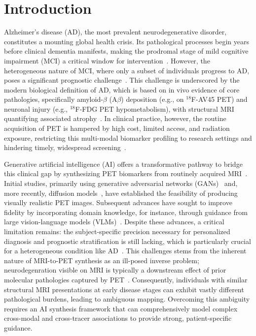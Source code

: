 \documentclass[a4paper]{cas-sc}
\begin{document}
\section{Introduction}\label{sec1}
Alzheimer's disease (AD), the most prevalent neurodegenerative disorder, constitutes a mounting global health crisis. Its pathological processes begin years before clinical dementia manifests, making the prodromal stage of mild cognitive impairment (MCI) a critical window for intervention~\citep{scheltens2021alzheimer}. However, the heterogeneous nature of MCI, where only a subset of individuals progress to AD, poses a significant prognostic challenge~\citep{haller2023neuroimaging}. This challenge is underscored by the modern biological definition of AD, which is based on in vivo evidence of core pathologies, specifically amyloid-$\beta$ (A$\beta$) deposition (e.g., on $^{18}$F-AV45 PET) and neuronal injury (e.g., $^{18}$F-FDG PET hypometabolism), with structural MRI quantifying associated atrophy~\citep{ossenkoppele2022amyloid,yan2021sex,haller2023neuroimaging}. In clinical practice, however, the routine acquisition of PET is hampered by high cost, limited access, and radiation exposure, restricting this multi-modal biomarker profiling to research settings and hindering timely, widespread screening~\citep{nordberg2010use}.

Generative artificial intelligence (AI) offers a transformative pathway to bridge this clinical gap by synthesizing PET biomarkers from routinely acquired MRI~\citep{dayarathna2024deep,lee2024synthesizing}. Initial studies, primarily using generative adversarial networks (GANs)~\citep{pan2018synthesizing,pan2020spatially,apostolopoulos2022applications} and, more recently, diffusion models~\citep{xie2024synthesizing,chen2025multi,theodorou2025mri2pet}, have established the feasibility of producing visually realistic PET images. Subsequent advances have sought to improve fidelity by incorporating domain knowledge, for instance, through guidance from large vision-language models (VLMs)~\citep{wang2025unisyn,liu2025direct}.  Despite these advances, a critical limitation remains: the subject-specific precision necessary for personalized diagnosis and prognostic stratification is still lacking, which is particularly crucial for a heterogeneous condition like AD~\citep{ossenkoppele2022amyloid}. This challenges stems from the inherent nature of MRI-to-PET synthesis as an ill-posed inverse problem; neurodegenration visible on MRI is typically a downstream effect of prior molecular pathologies captured by PET~\citep{jagust2018imaging}. Consequently, individuals with similar structural MRI presentations at early disease stages can exhibit vastly different pathological burdens, leading to ambiguous mapping. Overcoming this ambiguity requires an AI synthesis framework that can comprehensively model complex cross-modal and cross-tracer associations to provide strong, patient-specific guidance.
\end{document}
